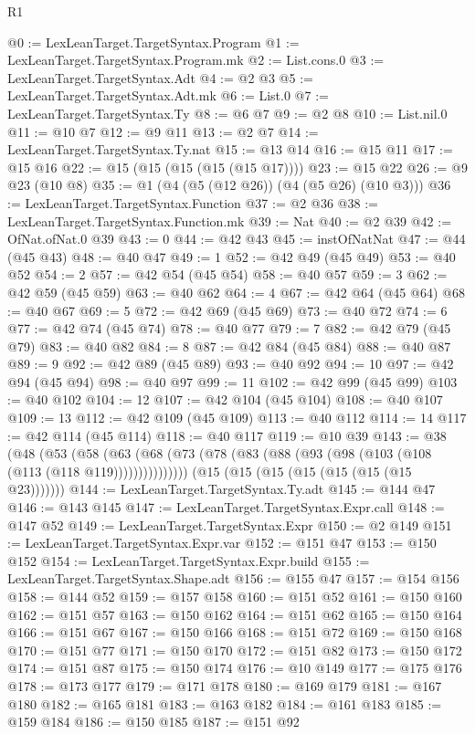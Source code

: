 \begin{lexlean}{R1}
\begin{coremodule}
@0 := LexLeanTarget.TargetSyntax.Program
@1 := LexLeanTarget.TargetSyntax.Program.mk
@2 := List.cons.{0}
@3 := LexLeanTarget.TargetSyntax.Adt
@4 := @2 @3
@5 := LexLeanTarget.TargetSyntax.Adt.mk
@6 := List.{0}
@7 := LexLeanTarget.TargetSyntax.Ty
@8 := @6 @7
@9 := @2 @8
@10 := List.nil.{0}
@11 := @10 @7
@12 := @9 @11
@13 := @2 @7
@14 := LexLeanTarget.TargetSyntax.Ty.nat
@15 := @13 @14
@16 := @15 @11
@17 := @15 @16
@22 := @15 (@15 (@15 (@15 (@15 @17))))
@23 := @15 @22
@26 := @9 @23 (@10 @8)
@35 := @1 (@4 (@5 (@12 @26)) (@4 (@5 @26) (@10 @3)))
@36 := LexLeanTarget.TargetSyntax.Function
@37 := @2 @36
@38 := LexLeanTarget.TargetSyntax.Function.mk
@39 := Nat
@40 := @2 @39
@42 := OfNat.ofNat.{0} @39
@43 := 0
@44 := @42 @43
@45 := instOfNatNat
@47 := @44 (@45 @43)
@48 := @40 @47
@49 := 1
@52 := @42 @49 (@45 @49)
@53 := @40 @52
@54 := 2
@57 := @42 @54 (@45 @54)
@58 := @40 @57
@59 := 3
@62 := @42 @59 (@45 @59)
@63 := @40 @62
@64 := 4
@67 := @42 @64 (@45 @64)
@68 := @40 @67
@69 := 5
@72 := @42 @69 (@45 @69)
@73 := @40 @72
@74 := 6
@77 := @42 @74 (@45 @74)
@78 := @40 @77
@79 := 7
@82 := @42 @79 (@45 @79)
@83 := @40 @82
@84 := 8
@87 := @42 @84 (@45 @84)
@88 := @40 @87
@89 := 9
@92 := @42 @89 (@45 @89)
@93 := @40 @92
@94 := 10
@97 := @42 @94 (@45 @94)
@98 := @40 @97
@99 := 11
@102 := @42 @99 (@45 @99)
@103 := @40 @102
@104 := 12
@107 := @42 @104 (@45 @104)
@108 := @40 @107
@109 := 13
@112 := @42 @109 (@45 @109)
@113 := @40 @112
@114 := 14
@117 := @42 @114 (@45 @114)
@118 := @40 @117
@119 := @10 @39
@143 := @38
    (@48
      (@53 (@58 (@63 (@68 (@73 (@78 (@83 (@88 (@93 (@98 (@103 (@108 (@113 (@118 @119)))))))))))))))
    (@15 (@15 (@15 (@15 (@15 (@15 (@15 @23)))))))
@144 := LexLeanTarget.TargetSyntax.Ty.adt
@145 := @144 @47
@146 := @143 @145
@147 := LexLeanTarget.TargetSyntax.Expr.call
@148 := @147 @52
@149 := LexLeanTarget.TargetSyntax.Expr
@150 := @2 @149
@151 := LexLeanTarget.TargetSyntax.Expr.var
@152 := @151 @47
@153 := @150 @152
@154 := LexLeanTarget.TargetSyntax.Expr.build
@155 := LexLeanTarget.TargetSyntax.Shape.adt
@156 := @155 @47
@157 := @154 @156
@158 := @144 @52
@159 := @157 @158
@160 := @151 @52
@161 := @150 @160
@162 := @151 @57
@163 := @150 @162
@164 := @151 @62
@165 := @150 @164
@166 := @151 @67
@167 := @150 @166
@168 := @151 @72
@169 := @150 @168
@170 := @151 @77
@171 := @150 @170
@172 := @151 @82
@173 := @150 @172
@174 := @151 @87
@175 := @150 @174
@176 := @10 @149
@177 := @175 @176
@178 := @173 @177
@179 := @171 @178
@180 := @169 @179
@181 := @167 @180
@182 := @165 @181
@183 := @163 @182
@184 := @161 @183
@185 := @159 @184
@186 := @150 @185
@187 := @151 @92

\end{coremodule}
\end{lexlean}
